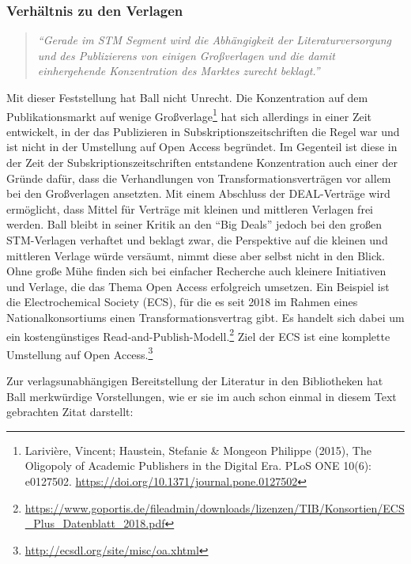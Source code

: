 \documentclass[a4paper,
fontsize=11pt,
oneside,
numbers=noperiodatend,
parskip=half-,
bibliography=totoc,
final
]{scrartcl}
\begin{document}
\hypertarget{verhuxe4ltnis-zu-den-verlagen}{%
\subsubsection{Verhältnis zu den
Verlagen}\label{verhuxe4ltnis-zu-den-verlagen}}

\begin{quote}
\emph{\enquote{Gerade im STM Segment wird die Abhängigkeit der
Literaturversorgung und des Publizierens von einigen Großverlagen und
die damit einhergehende Konzentration des Marktes zurecht beklagt.}}
\end{quote}

Mit dieser Feststellung hat Ball nicht Unrecht. Die Konzentration auf
dem Publikationsmarkt auf wenige Großverlage\footnote{Larivière,
  Vincent; Haustein, Stefanie \& Mongeon Philippe (2015), The Oligopoly
  of Academic Publishers in the Digital Era. PLoS ONE 10(6): e0127502.
  \url{https://doi.org/10.1371/journal.pone.0127502}} hat sich
allerdings in einer Zeit entwickelt, in der das Publizieren in
Subskriptionszeitschriften die Regel war und ist nicht in der Umstellung
auf Open Access begründet. Im Gegenteil ist diese in der Zeit der
Subskriptionszeitschriften entstandene Konzentration auch einer der
Gründe dafür, dass die Verhandlungen von Transformationsverträgen vor
allem bei den Großverlagen ansetzten. Mit einem Abschluss der
DEAL-Verträge wird ermöglicht, dass Mittel für Verträge mit kleinen und
mittleren Verlagen frei werden. Ball bleibt in seiner Kritik an den
\enquote{Big Deals} jedoch bei den großen STM-Verlagen verhaftet und
beklagt zwar, die Perspektive auf die kleinen und mittleren Verlage
würde versäumt, nimmt diese aber selbst nicht in den Blick. Ohne große
Mühe finden sich bei einfacher Recherche auch kleinere Initiativen und
Verlage, die das Thema Open Access erfolgreich umsetzen. Ein Beispiel
ist die Electrochemical Society (ECS), für die es seit 2018 im Rahmen
eines Nationalkonsortiums einen Transformationsvertrag gibt. Es handelt
sich dabei um ein kostengünstiges Read-and-Publish-Modell.\footnote{\url{https://www.goportis.de/fileadmin/downloads/lizenzen/TIB/Konsortien/ECS_Plus_Datenblatt_2018.pdf}}
Ziel der ECS ist eine komplette Umstellung auf Open Access.\footnote{\url{http://ecsdl.org/site/misc/oa.xhtml}}

Zur verlagsunabhängigen Bereitstellung der Literatur in den Bibliotheken
hat Ball merkwürdige Vorstellungen, wie er sie im auch schon einmal in
diesem Text gebrachten Zitat darstellt:
\end{document}
